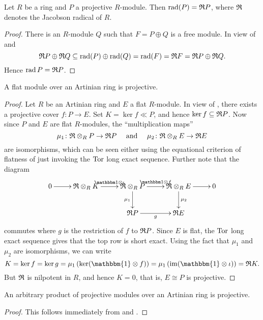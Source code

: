 \begin{proposition}
    Let $R$ be a ring and $P$ a projective $R$-module. Then $\operatorname{rad}(P) = \mathfrak{R} P$, where $\mathfrak{R}$ denotes the Jacobson radical of $R$.
\end{proposition}
\begin{proof}
    There is an $R$-module $Q$ such that $F = P\oplus Q$ is a free module. In view of  and 
    \begin{equation*}
        \mathfrak{R} P\oplus\mathfrak{R} Q\subseteq\operatorname{rad}(P)\oplus\operatorname{rad}(Q) = \operatorname{rad}(F) = \mathfrak{R} F = \mathfrak{R} P\oplus\mathfrak{R} Q.
    \end{equation*}
    Hence $\operatorname{rad} P = \mathfrak{R} P$.
\end{proof}

\begin{theorem}
    A flat module over an Artinian ring is projective.
\end{theorem}
\begin{proof}
    Let $R$ be an Artinian ring and $E$ a flat $R$-module. In view of , there exists a projective cover $f\colon P\to E$. Set $K = \ker f\ll P$, and hence $\ker f\subseteq\mathfrak{R} P$. Now since $P$ and $E$ are flat $R$-modules, the ``multiplication maps''
    \begin{equation*}
        \mu_1\colon\mathfrak{R}\otimes_R P\to\mathfrak{R} P\quad\text{ and }\quad\mu_2\colon\mathfrak{R}\otimes_R E\to \mathfrak{R} E
    \end{equation*}
    are isomorphisms, which can be seen either using the equational criterion of flatness of just invoking the $\operatorname{Tor}$ long exact sequence. Further note that the diagram 
    \begin{equation*}
        \xymatrix {
            0\ar[r] & \frakR\otimes_R K\ar[r]^-{\mathbbm 1\otimes\iota} & \frakR\otimes_R P\ar[r]^-{\mathbbm 1\otimes f}\ar[d]_{\mu_1} & \frakR\otimes_R E\ar[d]^{\mu_2}\ar[r] & 0\\
            & & \frakR P\ar[r]_-{g} & \frakR E
        }
    \end{equation*}
    commutes where $g$ is the restriction of $f$ to $\mathfrak{R} P$. Since $E$ is flat, the $\operatorname{Tor}$ long exact sequence gives that the top row is short exact. Using the fact that $\mu_1$ and $\mu_2$ are isomorphisms, we can write 
    \begin{equation*}
        K = \ker f = \ker g = \mu_1\left(\ker(\mathbbm{1}\otimes f)\right) = \mu_1\left(\im(\mathbbm{1}\otimes\iota)\right) = \frakR K.
    \end{equation*}
    But $\mathfrak{R}$ is nilpotent in $R$, and hence $K = 0$, that is, $E\cong P$ is projective.
\end{proof}

\begin{corollary}
    An arbitrary product of projective modules over an Artinian ring is projective.
\end{corollary}
\begin{proof}
    This follows immediately from  and .
\end{proof}